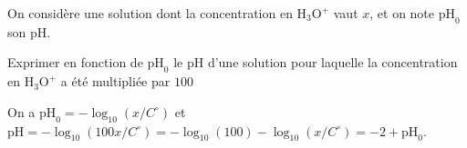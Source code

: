 \pauseEntrainement

\medskip

On considère une solution dont la concentration en $\textrm{H}_3\textrm{O}^+$ vaut $x$, et on note $\text{pH}_0$ son \textrm{pH}. 


\repriseEntrainement




\begin{enonce}
Exprimer en fonction de $\textrm{pH}_0$ le \textrm{pH} d'une solution pour laquelle la concentration en $\textrm{H}_3\textrm{O}^+$ a été multipliée par $100$
\end{enonce}


\begin{corrigeNewpage}
On a $\textrm{pH}_0=-\log_{10}(x/C^{\circ})$ et $\textrm{pH}=-\log_{10}(100x/C^{\circ})=-\log_{10}(100)-\log_{10}(x/C^{\circ})=-2+\textrm{pH}_0$.
\end{corrigeNewpage}


\finEntrainement







\hauteurLargeurCadreReponse		{7mm}{4cm}
\initialisationEntrainement

